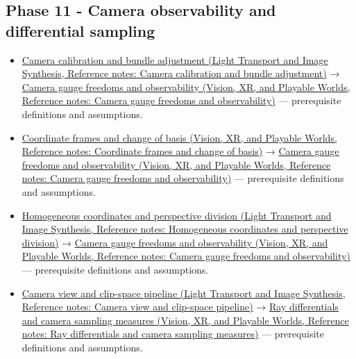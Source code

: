 \subsection{Phase 11 - Camera observability and differential sampling}\label{appendix-4ad47bdd269a-phase-11---camera-observability-and-differential-sampling}

\begin{itemize}
\tightlist
\item
  \href{../04-Light-Transport-and-Image-Synthesis/main.pdf\#nameddest=appendix-3ee9861904d5}{Camera calibration and bundle adjustment (Light Transport and Image Synthesis, Reference notes: Camera calibration and bundle adjustment)} → \href{../07-Vision-XR-and-Playable-Worlds/main.pdf\#nameddest=appendix-113f0267e5f4}{Camera gauge freedoms and observability (Vision, XR, and Playable Worlds, Reference notes: Camera gauge freedoms and observability)} --- prerequisite definitions and assumptions.
\item
  \href{../07-Vision-XR-and-Playable-Worlds/main.pdf\#nameddest=appendix-1bae9457dbc3}{Coordinate frames and change of basis (Vision, XR, and Playable Worlds, Reference notes: Coordinate frames and change of basis)} → \href{../07-Vision-XR-and-Playable-Worlds/main.pdf\#nameddest=appendix-113f0267e5f4}{Camera gauge freedoms and observability (Vision, XR, and Playable Worlds, Reference notes: Camera gauge freedoms and observability)} --- prerequisite definitions and assumptions.
\item
  \href{../04-Light-Transport-and-Image-Synthesis/main.pdf\#nameddest=appendix-cb3b26862282}{Homogeneous coordinates and perspective division (Light Transport and Image Synthesis, Reference notes: Homogeneous coordinates and perspective division)} → \href{../07-Vision-XR-and-Playable-Worlds/main.pdf\#nameddest=appendix-113f0267e5f4}{Camera gauge freedoms and observability (Vision, XR, and Playable Worlds, Reference notes: Camera gauge freedoms and observability)} --- prerequisite definitions and assumptions.
\item
  \href{../04-Light-Transport-and-Image-Synthesis/main.pdf\#nameddest=appendix-1c07d64f5e70}{Camera view and clip-space pipeline (Light Transport and Image Synthesis, Reference notes: Camera view and clip-space pipeline)} → \href{../07-Vision-XR-and-Playable-Worlds/main.pdf\#nameddest=appendix-8c40fad29462}{Ray differentials and camera sampling measures (Vision, XR, and Playable Worlds, Reference notes: Ray differentials and camera sampling measures)} --- prerequisite definitions and assumptions.

\end{itemize}
